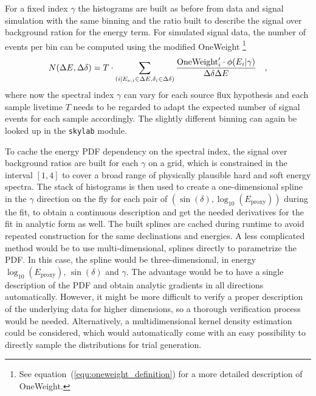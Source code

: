 For a fixed index $\gamma$ the histograms are built as before from data and signal simulation with the same binning and the ratio built to describe the signal over background ration for the energy term.
For simulated signal data, the number of events per bin can be computed using the modified OneWeight \footnote{See equation~(\ref{equ:oneweight_definition}) for a more detailed description of OneWeight.}
\begin{equation}
  N(\Delta E, \Delta\delta)
  = T\cdot \sum_{(i|E_{\nu,i}\in\Delta E, \delta_i\in\Delta\delta)}
    \frac{\text{OneWeight}'_i \cdot \phi(E_i|\gamma)}{\Delta\delta \Delta E}
  \quad\text{,}
\end{equation}
where now the spectral index $\gamma$ can vary for each source flux hypothesis and each sample livetime $T$ needs to be regarded to adapt the expected number of signal events for each sample accordingly.
The slightly different binning can again be looked up in the \lstinline!skylab! module.

To cache the energy PDF dependency on the spectral index, the signal over background ratios are built for each $\gamma$ on a grid, which is constrained in the interval $[1, 4]$ to cover a broad range of physically plausible hard and soft energy spectra.
The stack of histograms is then used to create a one-dimensional spline in the $\gamma$ direction on the fly for each pair of $\left(\sin(\delta), \log_{10}\left(E_\text{proxy}\right)\right)$ during the fit, to obtain a continuous description and get the needed derivatives for the fit in analytic form as well.
The built splines are cached during runtime to avoid repeated construction for the same declinations and energies.
A less complicated method would be to use multi-dimensional, splines directly to parametrize the PDF.
In this case, the spline would be three-dimensional, in energy $\log_{10}\left(E_\text{proxy}\right)$, $\sin(\delta)$ and $\gamma$.
The advantage would be to have a single description of the PDF and obtain analytic gradients in all directions automatically.
However, it might be more difficult to verify a proper description of the underlying data for higher dimensions, so a thorough verification process would be needed.
Alternatively, a multidimensional kernel density estimation could be considered, which would automatically come with an easy possibility to directly sample the distributions for trial generation.


